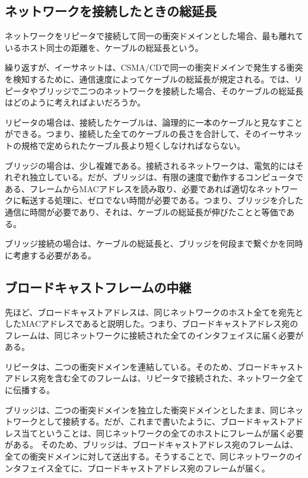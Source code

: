 \subsection{ネットワークを接続したときの総延長}

ネットワークをリピータで接続して同一の衝突ドメインとした場合、最も離れているホスト同士の距離を、ケーブルの総延長という。

繰り返すが、イーサネットは、CSMA/CDで同一の衝突ドメインで発生する衝突を検知するために、通信速度によってケーブルの総延長が規定される。では、リピータやブリッジで二つのネットワークを接続した場合、そのケーブルの総延長はどのように考えればよいだろうか。

リピータの場合は、接続したケーブルは、論理的に一本のケーブルと見なすことができる。つまり、接続した全てのケーブルの長さを合計して、そのイーサネットの規格で定められたケーブル長より短くしなければならない。

ブリッジの場合は、少し複雑である。接続されるネットワークは、電気的にはそれぞれ独立している。だが、ブリッジは、有限の速度で動作するコンピュータである、フレームからMACアドレスを読み取り、必要であれば適切なネットワークに転送する処理に、ゼロでない時間が必要である。つまり、ブリッジを介した通信に時間が必要であり、それは、ケーブルの総延長が伸びたことと等価である。

ブリッジ接続の場合は、ケーブルの総延長と、ブリッジを何段まで繋ぐかを同時に考慮する必要がある。

\subsection{ブロードキャストフレームの中継}
先ほど、ブロードキャストアドレスは、同じネットワークのホスト全てを宛先としたMACアドレスであると説明した。つまり、ブロードキャストアドレス宛のフレームは、同じネットワークに接続された全てのインタフェイスに届く必要がある。

リピータは、二つの衝突ドメインを連結している。そのため、ブロードキャストアドレス宛を含む全てのフレームは、リピータで接続された、ネットワーク全てに伝播する。

ブリッジは、二つの衝突ドメインを独立した衝突ドメインとしたまま、同じネットワークとして接続する。だが、これまで書いたように、ブロードキャストアドレス当てということは、同じネットワークの全てのホストにフレームが届く必要がある。
そのため、ブリッジは、ブロードキャストアドレス宛のフレームは、全ての衝突ドメインに対して送出する。そうすることで、同じネットワークのインタフェイス全てに、ブロードキャストアドレス宛のフレームが届く。

